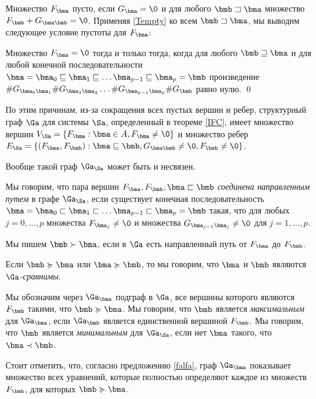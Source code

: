 Множество $F_\bma$ пусто, если $G_\bma=\0$ и для любого $\bmb\sqsupset\bma$ множество $F_\bmb+G_{\bma\bmb}=\0$. 
Применяя \eqref{Tempty} ко всем $\bmb\sqsupset\bma$, мы выводим следующее условие пустоты для $F_\bma$:

\begin{lemma}
Множество $F_\bma=\0$ тогда и только тогда, когда для любого $\bmb\sqsupseteq\bma$ и для любой конечной последовательности\\ $\bma=\bma_0\sqsubseteq\bma_1\sqsubseteq\ldots \bma_{p-1}\sqsubseteq\bma_p=\bmb$ произведение 
$\#G_{\bma_0\bma_1}\#G_{\bma_1\bma_2}\ldots  \#G_{\bma_{p-1}\bma_p}\#G_{\bmb}$ равно нулю. 
\qed
\end{lemma}


По этим причинам, из-за сокращения всех пустых вершин и ребер, структурный граф $\Ga$ для системы $\Sa$, определенный в теореме \ref{IFC}, имеет множество вершин $V_\Sa=\{F_\bma: \bma\in A, F_\bma\neq\0\}$ и множество ребер
$E_\Sa=\{(F_\bma, F_\bmb): \bma\sqsubseteq\bmb, G_{\bma\bmb}\neq\0, F_\bmb\neq\0\}$. 

Вообще такой граф $\Ga_\Sa$ может быть и несвязен.

\begin{definition}
Мы говорим, что пара вершин $F_\bma, F_\bmb, \bma\sqsubset\bmb$ {\em соединена направленным путем} в графе $\Ga_\Sa$, если существует конечная последовательность  $\bma=\bma_0\sqsubset\bma_1\sqsubset\ldots \bma_{p-1}\sqsubset\bma_p=\bmb$ такая, что для любых  $j=0,\ldots  ,p$ множества $F_{\bma_j}\neq\0$  и множества $G_{\bma_{j-1}\bma_j}\neq\0$ для $j=1,\ldots  ,p$.   
\end{definition}

Мы пишем $\bmb\succ\bma$, если в $\Ga$ есть направленный путь от $F_\bma$ до $F_\bmb$.

Если $\bmb\succcurlyeq\bma$ или $\bma\succcurlyeq\bmb$, то мы говорим, что $\bma$ и $\bmb$ являются $\Ga${\em-сравнимы}.

Мы обозначим через $\Ga_\bma$ подграф в $\Ga$, все вершины которого являются $F_\bmb$ такими, что $\bmb\succcurlyeq\bma$. 
Мы говорим, что $\bmb$ является {\em максимальным} для $\Ga_\bma$, если $\Ga_\bmb$ является единственной вершиной $F_\bmb$.
Мы говорим, что $\bmb$ является {\em минимальным} для $\Ga_\Sa$, если нет $\bma$ такого, что $\bma\prec\bmb$.

Стоит отметить, что, согласно предложению \ref{falfa}, граф $\Ga_\bma$ показывает множество всех уравнений, которые полностью определяют каждое из множеств $F_\bmb$, для которых $\bmb\succcurlyeq\bma$.\\

